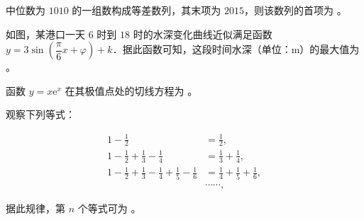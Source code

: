 \begin{question}
中位数为 $1010$ 的一组数构成等差数列，其末项为 $2015$，则该数列的首项为 \gkblank{}。

\Needspace{0.4\textheight}
\end{question}
\begin{question}
如图，某港口一天 $6$ 时到 $18$ 时的水深变化曲线近似满足函数 $y=3\sin\left(\dfrac{\pi}{6}x+\varphi\right)+k$．据此函数可知，这段时间水深（单位：$\mathrm{m}$）的最大值为 \gkblank{}。
\nopagebreak[4]
\begin{center}\end{center}
\nopagebreak[4]
\end{question}
\begin{question}
函数 $y=x\mathrm{e}^{x}$ 在其极值点处的切线方程为 \gkblank{}。

\end{question}
\begin{question}
观察下列等式：

\nopagebreak[4]
\[
\begin{aligned}
1-\frac{1}{2}&=\frac{1}{2},\\
1-\frac{1}{2}+\frac{1}{3}-\frac{1}{4}&=\frac{1}{3}+\frac{1}{4},\\
1-\frac{1}{2}+\frac{1}{3}-\frac{1}{4}+\frac{1}{5}-\frac{1}{6}&=\frac{1}{4}+\frac{1}{5}+\frac{1}{6},\\
&\cdots\cdots,
\end{aligned}
\]

据此规律，第 $n$ 个等式可为 \gkblank{}。

\end{question}

